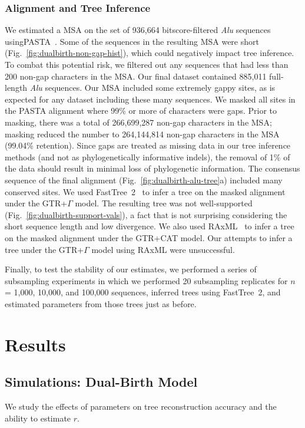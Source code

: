 \subsubsection{Alignment and Tree Inference}\label{sec:alutree}
We estimated a \gls{MSA} on the set of 936,664 bitscore-filtered \textit{Alu} sequences using\break PASTA~\cite{Mirarab2015}. Some of the sequences in the resulting MSA were short (Fig.~\ref{fig:dualbirth-non-gap-hist}), which could negatively impact tree inference. To combat this potential risk, we filtered out any sequences that had less than 200 non-gap characters in the \gls{MSA}. Our final dataset contained 885,011 full-length \textit{Alu} sequences. Our \gls{MSA} included some extremely gappy sites, as is expected for any dataset including these many sequences. We masked all sites in the PASTA alignment where 99\% or more of characters were gaps. Prior to masking, there was a total of 266,699,287 non-gap characters in the \gls{MSA}; masking reduced the number to 264,144,814 non-gap characters in the \gls{MSA} (99.04\% retention). Since gaps are treated as missing data in our tree inference methods (and not as phylogenetically informative indels), the removal of 1\% of the data should result in minimal loss of phylogenetic information. The consensus sequence of the final alignment (Fig.~\ref{fig:dualbirth-alu-tree}a) included many conserved sites. We used FastTree~2~\cite{Price2010} to infer a tree on the masked alignment under the \gls{GTR}+$\Gamma$ model. The resulting tree was not well-supported (Fig.~\ref{fig:dualbirth-support-vals}), a fact that is not surprising considering the short sequence length and low divergence. We also used RAxML~\cite{Stamatakis2014} to infer a tree on the masked alignment under the \gls{GTR}+CAT model. Our attempts to infer a tree under the \gls{GTR}+$\Gamma$ model using RAxML were unsuccessful.

Finally, to test the stability of our estimates, we performed a series of subsampling experiments in which we performed 20 subsampling replicates for $n$ = 1,000, 10,000, and 100,000 sequences, inferred trees using FastTree~2, and estimated parameters from those trees just as before.

\section{Results}
\subsection{Simulations: Dual-Birth Model}
We study the effects of parameters on tree reconstruction accuracy and the ability to estimate $r$.

